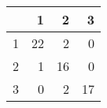 \begin{tabular}{rrrr}
  \hline
 & 1 & 2 & 3 \\ 
  \hline
1 &  22 &   2 &   0 \\ 
  2 &   1 &  16 &   0 \\ 
  3 &   0 &   2 &  17 \\ 
   \hline
\end{tabular}
